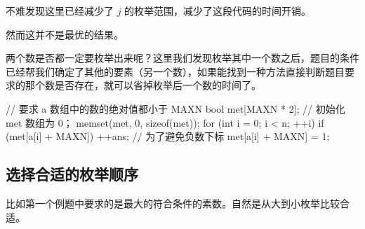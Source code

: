 不难发现这里已经减少了 $j$ 的枚举范围，减少了这段代码的时间开销。

然而这并不是最优的结果。

两个数是否都一定要枚举出来呢？这里我们发现枚举其中一个数之后，题目的条件已经帮我们确定了其他的要素（另一个数），如果能找到一种方法直接判断题目要求的那个数是否存在，就可以省掉枚举后一个数的时间了。

\begin{cppcode}
// 要求 a 数组中的数的绝对值都小于 MAXN
bool met[MAXN * 2];
// 初始化 met 数组为 0；
memset(met, 0, sizeof(met));
for (int i = 0; i < n; ++i) {
  if (met[a[i] + MAXN]) ++ans;
  // 为了避免负数下标
  met[a[i] + MAXN] = 1;
}
\end{cppcode}

\subsection{选择合适的枚举顺序}

比如第一个例题中要求的是最大的符合条件的素数。自然是从大到小枚举比较合适。
